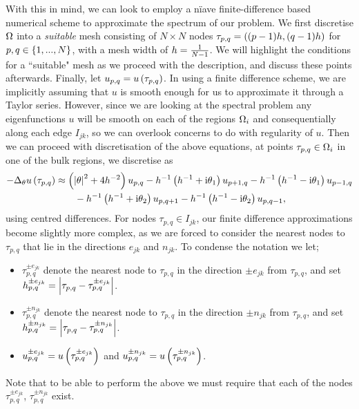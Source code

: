With this in mind, we can look to employ a n{\"i}ave finite-difference based numerical scheme to approximate the spectrum of our problem.
We first discretise $\Omega$ into a \emph{suitable} mesh consisting of $N\times N$ nodes $\tau_{p,q} = \left( (p-1)h,(q-1)h \right)$ for $p,q\in\left\{ 1,...,N \right\}$, with a mesh width of $h = \frac{1}{N-1}$.
We will highlight the conditions for a ``suitable" mesh as we proceed with the description, and discuss these points afterwards.
Finally, let $u_{p,q} = u\left( \tau_{p,q} \right)$.
In using a finite difference scheme, we are implicitly assuming that $u$ is smooth enough for us to approximate it through a Taylor series.
However, since we are looking at the spectral problem any eigenfunctions $u$ will be smooth on each of the regions $\Omega_i$ and consequentially along each edge $I_{jk}$, so we can overlook concerns to do with regularity of $u$.
Then we can proceed with discretisation of the above equations, at points $\tau_{p,q}\in\Omega_i$ in one of the bulk regions, we discretise as
\begin{align*}
	-\Delta_\theta u\left( \tau_{p,q} \right) &\approx 
	\left( \left\lvert \theta \right\rvert^2 + 4h^{-2} \right)u_{p,q}
	-h^{-1}\left( h^{-1} + \mathrm{i}\theta_1 \right)u_{p+1,q}
	-h^{-1}\left( h^{-1} - \mathrm{i}\theta_1 \right)u_{p-1,q} \\
	&\qquad -h^{-1}\left( h^{-1} + \mathrm{i}\theta_2 \right)u_{p,q+1}
	-h^{-1}\left( h^{-1} - \mathrm{i}\theta_2 \right)u_{p,q-1},
\end{align*}
using centred differences.
For nodes $\tau_{p,q}\in I_{jk}$, our finite difference approximations become slightly more complex, as we are forced to consider the nearest nodes to $\tau_{p,q}$ that lie in the directions $e_{jk}$ and $n_{jk}$.
To condense the notation we let;
\begin{itemize}
	\item $\tau_{p,q}^{\pm e_{jk}}$ denote the nearest node to $\tau_{p,q}$ in the direction $\pm e_{jk}$ from $\tau_{p,q}$, and set $h_{p,q}^{\pm e_{jk}} = \left\lvert  \tau_{p,q} - \tau_{p,q}^{\pm e_{jk}}  \right\rvert$.
	\item $\tau_{p,q}^{\pm n_{jk}}$ denote the nearest node to $\tau_{p,q}$ in the direction $\pm n_{jk}$ from $\tau_{p,q}$, and set $h_{p,q}^{\pm n_{jk}} = \left\lvert  \tau_{p,q} - \tau_{p,q}^{\pm n_{jk}}  \right\rvert$.
	\item $u_{p,q}^{\pm e_{jk}} = u\left( \tau_{p,q}^{\pm e_{jk}} \right)$ and $u_{p,q}^{\pm n_{jk}} = u\left( \tau_{p,q}^{\pm n_{jk}} \right)$.
\end{itemize}
Note that to be able to perform the above we must require that each of the nodes $\tau_{p,q}^{\pm e_{jk}}$, $\tau_{p,q}^{\pm n_{jk}}$ exist.
